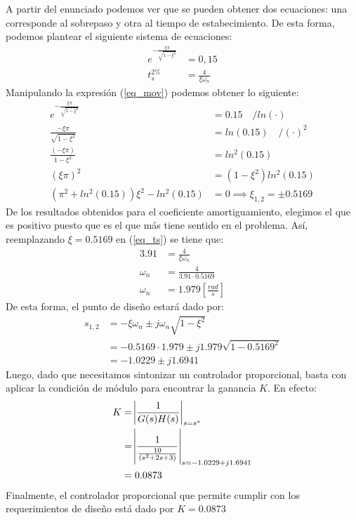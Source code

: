 \documentclass[
  11pt,
  letterpaper,
   addpoints,
   answers
  ]{exam}
\begin{document}
\begin{questions}
\begin{solution}
A partir del enunciado podemos ver que se pueden obtener dos ecuaciones: una corresponde al sobrepaso y otra al tiempo de estabecimiento. De esta forma, podemos plantear el siguiente sistema de ecuaciones:
\begin{align}
    e^{-\frac{\xi \pi}{\sqrt{1-\xi^2}}}&=0,15 \label{eq_mov} \\
    t_s^{2\%}&=\frac{4}{\xi \omega_n} \label{eq_ts}
\end{align}
Manipulando la expresión (\ref{eq_mov}) podemos obtener lo siguiente:
\begin{align}
    e^{-\frac{\xi \pi}{\sqrt{1-\xi^2}}}&=0.15  \quad / ln(\cdot) \nonumber \\
    \frac{-\xi \pi}{\sqrt{1-\xi^2}}&=ln(0.15) \quad  / (\cdot)^2 \nonumber \\
    \frac{(-\xi \pi)}{1-\xi^2}&=ln^2(0.15) \nonumber\\
    (\xi \pi)^2&=(1-\xi^2)ln^2(0.15) \nonumber\\
    (\pi^2+ln^2(0.15))\xi^2-ln^2(0.15)&=0 \implies \boxed{\xi_{1,2}=\pm 0.5169} \nonumber
\end{align}
De los resultados obtenidos para el coeficiente amortiguamiento, elegimos el que es positivo puesto que es el que más tiene sentido en el problema. Así, reemplazando $\xi=0.5169$ en (\ref{eq_ts}) se tiene que:
\begin{align}
    3.91 &=\frac{4}{\xi\omega_n} \nonumber \\
    \omega_n&=\frac{4}{3.91\cdot0.5169} \nonumber \\
    \omega_n&=1.979 [\frac{rad}{s}] \nonumber
\end{align}
De esta forma, el punto de diseño estará dado por:
\begin{align}
    s_{1,2}&=-\xi \omega_n \pm j\omega_n \sqrt{1-\xi^2} \nonumber\\
    &=-0.5169\cdot 1.979 \pm j1.979\sqrt{1-0.5169^2} \nonumber \\
    &=-1.0229 \pm j1.6941
\end{align}
Luego, dado que necesitamos sintonizar un controlador proporcional, basta con aplicar la condición de módulo para encontrar la ganancia $K$. En efecto:
\begin{align}
    K&=\abs{\frac{1}{G(s)H(s)}}_{s=s^*} \nonumber \\
    &=\abs{\frac{1}{\frac{10}{(s^2 + 2s +3)}}}_{s=-1.0229+j1.6941} \nonumber\\
    &=0.0873
\end{align}
Finalmente, el controlador proporcional que permite cumplir con los requerimientos de diseño está dado por $K=0.0873$

\end{solution}
\end{questions}
\end{document}
